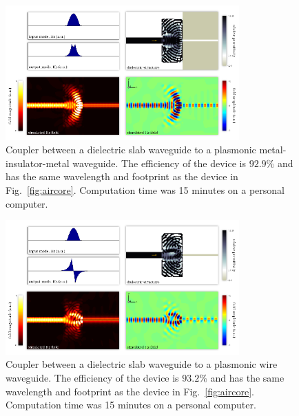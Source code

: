 \documentclass[letterpaper,10pt]{article}
\begin{document}
\begin{figure}[htbp]
    \centering
    \includegraphics[width=0.8\textwidth]{4}
    \caption{Coupler between a dielectric slab waveguide to 
            a plasmonic metal-insulator-metal waveguide.
        The efficiency of the device is $92.9\%$ and 
            has the same wavelength and footprint as the device in
            Fig.~\ref{fig:aircore}.
        Computation time was 15 minutes on a personal computer.
        }
        \label{fig:mim}
\end{figure}
\begin{figure}[htbp]
    \centering
    \includegraphics[width=0.8\textwidth]{5}
    \caption{Coupler between a dielectric slab waveguide to 
            a plasmonic wire waveguide.
        The efficiency of the device is $93.2\%$ and 
            has the same wavelength and footprint as the device in
            Fig.~\ref{fig:aircore}.
        Computation time was 15 minutes on a personal computer.
        }
        \label{fig:wire}
\end{figure}
\end{document}
